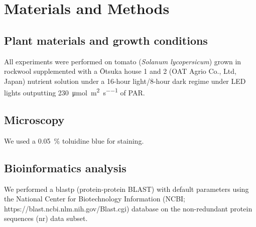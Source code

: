 \section{Materials and Methods}
\subsection{Plant materials and growth conditions}
All experiments were performed on tomato (\textit{Solanum lycopersicum}) grown in rockwool supplemented with a \={O}tsuka house 1 and 2 (OAT Agrio Co., Ltd, Japan) nutrient solution under a 16-hour light/8-hour dark regime under LED lights outputting \SI{230}{\micro\mole\per\square\meter\per\second} of PAR.

\subsection{Microscopy}
We used a \qty{0.05}{\percent} toluidine blue for staining.

\subsection{Bioinformatics analysis}
We performed a blastp (protein-protein BLAST) with default parameters using the National Center for Biotechnology Information (NCBI; https://blast.ncbi.nlm.nih.gov/Blast.cgi) database on the non-redundant protein sequences (nr) data subset.